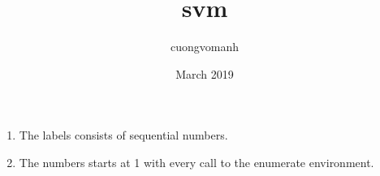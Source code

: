 \documentclass{article}
\title{svm}
\author{cuongvomanh}
\date{March 2019}
\begin{document}
    \begin{enumerate}
        \item The labels consists of sequential numbers.
        \item The numbers starts at 1 with every call to the enumerate environment.
    \end{enumerate}
\end{document}
